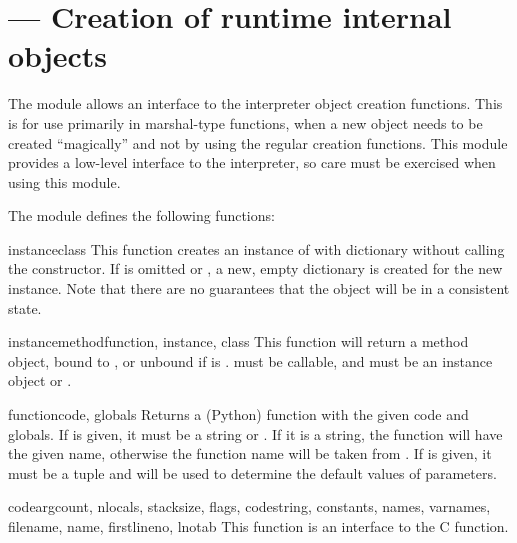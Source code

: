 \section{ ---
         Creation of runtime internal objects}



The  module allows an interface to the interpreter object
creation functions. This is for use primarily in marshal-type functions,
when a new object needs to be created ``magically'' and not by using the
regular creation functions. This module provides a low-level interface
to the interpreter, so care must be exercised when using this module.

The  module defines the following functions:

\begin{funcdesc}{instance}{class}
This function creates an instance of  with dictionary
 without calling the  constructor.  If
 is omitted or , a new, empty dictionary is
created for the new instance.  Note that there are no guarantees that
the object will be in a consistent state.
\end{funcdesc}

\begin{funcdesc}{instancemethod}{function, instance, class}
This function will return a method object, bound to , or
unbound if  is .   must be
callable, and  must be an instance object or
.
\end{funcdesc}

\begin{funcdesc}{function}{code, globals}
Returns a (Python) function with the given code and globals. If
 is given, it must be a string or .  If it is a
string, the function will have the given name, otherwise the function
name will be taken from .  If
 is given, it must be a tuple and will be used to
determine the default values of parameters.
\end{funcdesc}

\begin{funcdesc}{code}{argcount, nlocals, stacksize, flags, codestring,
                       constants, names, varnames, filename, name, firstlineno,
                       lnotab}
This function is an interface to the  C
function.
\end{funcdesc}

